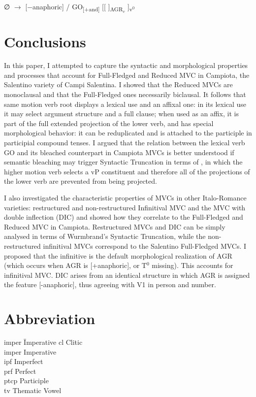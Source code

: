 \documentclass[output=paper]{langscibook}
\begin{document}
\ea \label{ac101}∅ $\rightarrow$ [−anaphoric] /  GO\textsubscript{[+and]} [[ \underline{\hspace{3em}} ]\textsubscript{AGR$_v$} ]\textsubscript{v$^0$}
\z

\section{Conclusions} 
 
In this paper, I attempted to capture the syntactic and morphological properties and processes that account for Full-Fledged and Reduced MVC in Campiota, the Salentino variety of Campi Salentina. I showed that the Reduced MVCs are monoclausal and that the Full-Fledged ones necessarily biclausal. It follows that same motion verb root displays a lexical use and an affixal one:  in its lexical use it may select argument structure and a full clause; when used as an affix, it is part of the full extended projection of the lower verb, and has special morphological behavior: it can be reduplicated and is attached to the participle in participial compound tenses. I argued that the relation between the lexical verb GO and its bleached counterpart in Campiota MVCs is better understood if semantic bleaching may trigger Syntactic Truncation  in terms of \citealt{wurmbrand2014a, wurmbrand2015, wurmbrand2017verb}, in which the higher motion verb selects a vP constituent and therefore all of the projections of the lower verb are prevented from being projected. 
 
I also investigated the characteristic properties of MVCs in other Italo-Romance varieties: restructured and non-restructured Infinitival MVC and the MVC with double inflection (DIC) and showed how they correlate to the Full-Fledged and Reduced MVC in Campiota.  Restructured MVCs and DIC can be simply analysed in terms of Wurmbrand's Syntactic Truncation, while the non-restructured infinitival MVCs correspond to the Salentino Full-Fledged MVCs.  I proposed that the infinitive is the default morphological realization of AGR (which occurs when AGR is [+anaphoric], or T$^0$ missing).  This accounts for infinitival MVC.  DIC arises from an identical structure in which AGR is assigned the feature [-anaphoric], thus agreeing with V1 in person and number. 

\section*{Abbreviation}
\begin{multicols}{2}
\begin{tabbing}
{\sc imper}\hspace{.5ex} \= Imperative \kill
{\sc cl} \> Clitic \\
{\sc imper} \> Imperative \\
{\sc ipf} \> Imperfect\\
{\sc prf} \> Perfect\\
{\sc ptcp} \> Participle\\
{\sc tv} \> Thematic Vowel
\end{tabbing}
\end{multicols}
\end{document}
